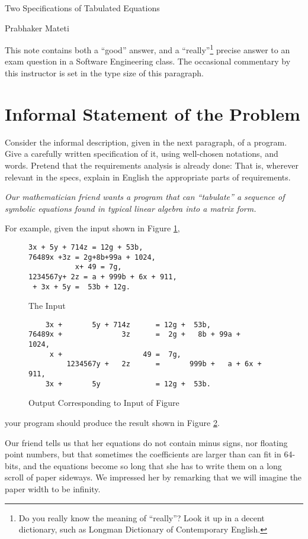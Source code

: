 \documentclass[12pt]{article}
\begin{document}
{\centering
{\Large Two Specifications of Tabulated Equations\\[5pt]}

Prabhaker Mateti\\
}

\bigskip

{\small This note contains both a ``good''  answer, and
a ``really''\footnote{Do you really know the meaning of ``really''?
Look it up in a decent dictionary, such as Longman Dictionary
of Contemporary English.}
precise answer to an exam question in a
Software Engineering class.  The occasional commentary by this
instructor is set in the type size of this paragraph.  }

\section{Informal Statement of the Problem}

Consider the informal description, given in the next paragraph, of a
program.  Give a carefully written specification of it, using
well-chosen notations, and words.  Pretend that the requirements
analysis is already done: That is, wherever relevant in the specs,
explain in English the appropriate parts of requirements.

{\sl
\parindent=0pt
Our mathematician friend wants a program that can ``tabulate'' a
sequence of symbolic equations found in typical linear algebra into a
matrix form.

For example, given the input shown in Figure \ref{inp},

\begin{figure}[hb]
\begin{verbatim}
3x + 5y + 714z = 12g + 53b,
76489x +3z = 2g+8b+99a + 1024,
           x+ 49 = 7g,
1234567y+ 2z = a + 999b + 6x + 911,
 + 3x + 5y =  53b + 12g.
\end{verbatim}
\caption{The Input}
\label{inp}
\end{figure}


\begin{figure}
\begin{verbatim}
    3x +       5y + 714z      = 12g +  53b,
76489x +              3z      =  2g +   8b + 99a +      1024,
     x +                   49 =  7g,
         1234567y +   2z      =       999b +   a + 6x +  911,
    3x +       5y             = 12g +  53b.
\end{verbatim}
\caption{Output Corresponding to Input of Figure \protect{\ref{inp}} }
\label{out}
\end{figure}

your program should produce the result shown in Figure \ref{out}.


\noindent  Our friend  tells us that her equations do not contain
minus signs, nor floating point numbers, but that sometimes the
coefficients are larger than can fit in 64-bits, and the equations
become so long that she has to write them on a long scroll of paper
sideways.  We impressed her by remarking that we will imagine the
paper width to be infinity.
}
\end{document}

